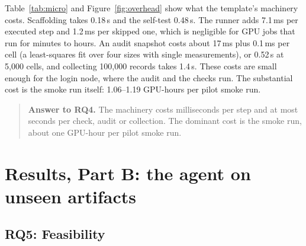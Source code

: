 \documentclass[pdflatex,sn-mathphys-num]{sn-jnl}
\theoremstyle{thmstyletwo}%
\theoremstyle{thmstylethree}%
\newcommand{\RQ}[1]{\textbf{RQ#1}}
\begin{document}
Table~\ref{tab:micro} and Figure~\ref{fig:overhead} show what the template's machinery costs. Scaffolding takes 0.18\,s and the self-test 0.48\,s. The runner adds 7.1\,ms per executed step and 1.2\,ms per skipped one, which is negligible for GPU jobs that run for minutes to hours. An audit snapshot costs about 17\,ms plus 0.1\,ms per cell (a least-squares fit over four sizes with single measurements), or 0.52\,s at 5{,}000 cells, and collecting 100{,}000 records takes 1.4\,s. These costs are small enough for the login node, where the audit and the checks run. The substantial cost is the smoke run itself: 1.06--1.19 GPU-hours per pilot smoke run.

\begin{quote}\small\textbf{Answer to \RQ{4}.} The machinery costs milliseconds per step and at most seconds per check, audit or collection. The dominant cost is the smoke run, about one GPU-hour per pilot smoke run.\end{quote}

\section{Results, Part B: the agent on unseen artifacts}\label{sec:resB}

\subsection{RQ5: Feasibility}\label{sec:rq5}
\end{document}

